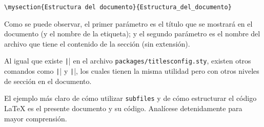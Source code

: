 \documentclass[../../main.tex]{subfile}
\begin{document}
  \begin{verbatim}
\mysection{Estructura del documento}{Estructura_del_documento}
  \end{verbatim}

  Como se puede observar, el primer parámetro es el título que se mostrará en el documento (y el nombre de la etiqueta); y el segundo parámetro es el nombre del archivo que tiene el contenido de la sección (sin extensión).

  Al igual que existe \texttt|\mysection| en el archivo \texttt{packages/titlesconfig.sty}, existen otros comandos como \texttt|\mysubsection| y \texttt|\mysubsubsection|, los cuales tienen la misma utilidad pero con otros niveles de sección en el documento.

  El ejemplo más claro de cómo utilizar \texttt{subfiles} y de cómo estructurar el código LaTeX es el presente documento y su código. Analícese detenidamente para mayor comprensión.
\end{document}
